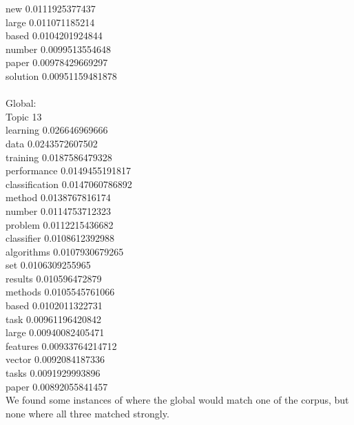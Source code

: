 \documentclass{article}
\begin{document}
{new 0.0111925377437\\
large 0.011071185214\\
based 0.0104201924844\\
number 0.0099513554648\\
paper 0.00978429669297\\
solution 0.00951159481878\\
\\
Global:\\
Topic 13\\
learning 0.026646969666\\
data 0.0243572607502\\
training 0.0187586479328\\
performance 0.0149455191817\\
classification 0.0147060786892\\
method 0.0138767816174\\
number 0.0114753712323\\
problem 0.0112215436682\\
classifier 0.0108612392988\\
algorithms 0.0107930679265\\
set 0.0106309255965\\
results 0.010596472879\\
methods 0.0105545761066\\
based 0.0102011322731\\
task 0.00961196420842\\
large 0.00940082405471\\
features 0.00933764214712\\
vector 0.0092084187336\\
tasks 0.0091929993896\\
paper 0.00892055841457\\

We found some instances of where the global would match one of the corpus, but none where all three matched strongly.

}
\end{document}
